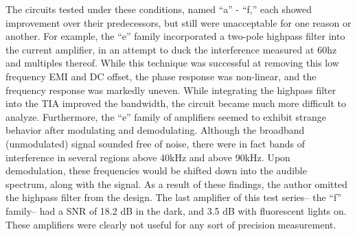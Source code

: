\documentclass[a4paper,10pt, twocolumn]{report}
\begin{document}
The circuits tested under these conditions, named “a” - “f,” each showed improvement over their predecessors, but still were unacceptable for one reason or another. For example, the “e” family incorporated a two-pole highpass filter into the current amplifier, in an attempt to duck the interference measured at 60hz and multiples thereof. While this technique was successful at removing this low frequency EMI and DC offset, the phase response was non-linear, and the frequency response was markedly uneven. While integrating the highpass filter into the TIA improved the bandwidth, the circuit became much more difficult to analyze. Furthermore, the “e” family of amplifiers seemed to exhibit strange behavior after modulating and demodulating. Although the broadband (unmodulated) signal sounded free of noise, there were in fact bands of interference in several regions above 40kHz and above 90kHz. Upon demodulation, these frequencies would be shifted down into the audible spectrum, along with the signal. As a result 
of these findings, the author omitted the highpass filter from the design. The last amplifier of this test series-- the “f” family-- had a SNR of 18.2 dB in the dark, and 3.5 dB with fluorescent lights on. These amplifiers were clearly not useful for any sort of precision measurement.



\end{document}
